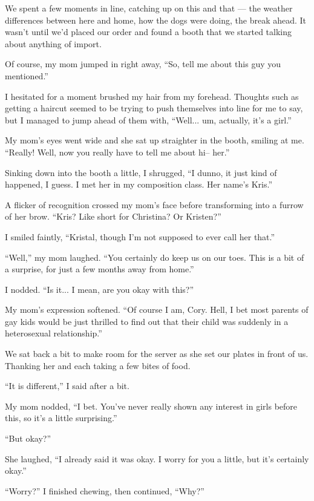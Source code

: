 We spent a few moments in line, catching up on this and that --- the weather differences between here and home, how the dogs were doing, the break ahead.  It wasn't until we'd placed our order and found a booth that we started talking about anything of import.

Of course, my mom jumped in right away, ``So, tell me about this guy you mentioned.''

I hesitated for a moment brushed my hair from my forehead.  Thoughts such as getting a haircut seemed to be trying to push themselves into line for me to say, but I managed to jump ahead of them with, ``Well... um, actually, it's a girl.''

My mom's eyes went wide and she sat up straighter in the booth, smiling at me.  ``Really!  Well, now you really have to tell me about hi-- her.''

Sinking down into the booth a little, I shrugged, ``I dunno, it just kind of happened, I guess.  I met her in my composition class.  Her name's Kris.''

A flicker of recognition crossed my mom's face before transforming into a furrow of her brow.  ``Kris?  Like short for Christina?  Or Kristen?''

I smiled faintly, ``Kristal, though I'm not supposed to ever call her that.''

``Well,'' my mom laughed.  ``You certainly do keep us on our toes.  This is a bit of a surprise, for just a few months away from home.''

I nodded.  ``Is it... I mean, are you okay with this?''

My mom's expression softened.  ``Of course I am, Cory.  Hell, I bet most parents of gay kids would be just thrilled to find out that their child was suddenly in a heterosexual relationship.''

We sat back a bit to make room for the server as she set our plates in front of us.  Thanking her and each taking a few bites of food.

``It is different,'' I said after a bit.

My mom nodded, ``I bet.  You've never really shown any interest in girls before this, so it's a little surprising.''

``But okay?''

She laughed, ``I already said it was okay.  I worry for you a little, but it's certainly okay.''

``Worry?'' I finished chewing, then continued, ``Why?''

